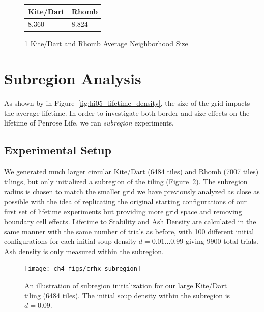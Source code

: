 \documentclass[a4paper,11pt,twoside]{report}
\begin{document}
\begin{figure}[htp]
\centering
\begin{tabular}{| l | l |}
\hline
Kite/Dart & Rhomb \\
\hline
8.360 & 8.824 \\
\hline
\end{tabular}
\caption[Kite/Dart and Rhomb Average Neighborhood Size]{
1	Kite/Dart and Rhomb Average Neighborhood Size
}
\label{tbl:avg_nbd}
\end{figure}

\section{Subregion Analysis}

As shown by \citeauthor{hi05} in Figure~\ref{fig:hi05_lifetime_density}, the size of the grid impacts the average lifetime. In order to investigate both border and size effects on the lifetime of Penrose Life, we ran \textit{subregion} experiments.

\subsection*{Experimental Setup}
We generated much larger circular Kite/Dart (6484 tiles) and Rhomb (7007 tiles) tilings, but only initialized a subregion of the tiling (Figure~\ref{fig:crhx_sub_init}). The subregion radius is chosen to match the smaller grid we have previously analyzed as close as possible with the idea of replicating the original starting configurations of our first set of lifetime experiments but providing more grid space and removing boundary cell effects. Lifetime to Stability and Ash Density are calculated in the same manner with the same number of trials as before, with 100 different initial configurations for each initial soup density $d=0.01...0.99$ giving 9900 total trials. Ash density is only measured within the subregion.

\begin{figure}[htp]
\centering
\texttt{[image: ch4\_figs/crhx\_subregion]}
\caption[Rhomb Subregion Initialization]{
	An illustration of subregion initialization for our large Kite/Dart tiling (6484 tiles). The initial soup density within the subregion is $d=0.09$.
}
\label{fig:crhx_sub_init}
\end{figure}
\end{document}

